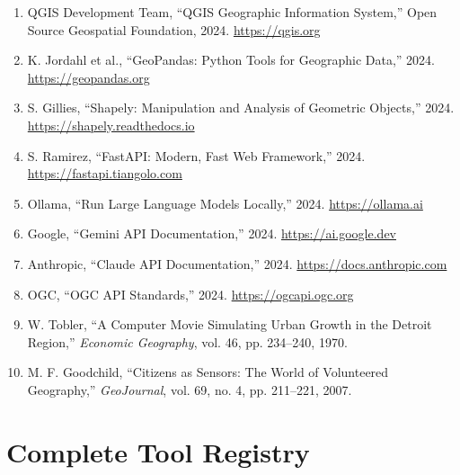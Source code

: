 \documentclass[12pt,a4paper]{report}
\begin{document}
\begin{enumerate}

\item QGIS Development Team, ``QGIS Geographic Information System,'' Open Source Geospatial Foundation, 2024. \url{https://qgis.org}

\item K. Jordahl et al., ``GeoPandas: Python Tools for Geographic Data,'' 2024. \url{https://geopandas.org}

\item S. Gillies, ``Shapely: Manipulation and Analysis of Geometric Objects,'' 2024. \url{https://shapely.readthedocs.io}

\item S. Ramirez, ``FastAPI: Modern, Fast Web Framework,'' 2024. \url{https://fastapi.tiangolo.com}

\item Ollama, ``Run Large Language Models Locally,'' 2024. \url{https://ollama.ai}

\item Google, ``Gemini API Documentation,'' 2024. \url{https://ai.google.dev}

\item Anthropic, ``Claude API Documentation,'' 2024. \url{https://docs.anthropic.com}

\item OGC, ``OGC API Standards,'' 2024. \url{https://ogcapi.ogc.org}

\item W. Tobler, ``A Computer Movie Simulating Urban Growth in the Detroit Region,'' \textit{Economic Geography}, vol. 46, pp. 234--240, 1970.

\item M. F. Goodchild, ``Citizens as Sensors: The World of Volunteered Geography,'' \textit{GeoJournal}, vol. 69, no. 4, pp. 211--221, 2007.

\end{enumerate}

\appendix

\chapter{Complete Tool Registry}
\end{document}

